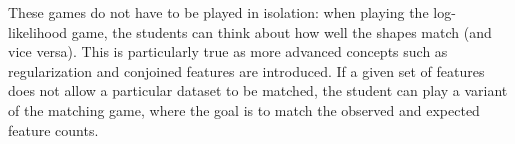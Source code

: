 \documentclass[11pt,letterpaper]{article}
\begin{document}
These games do not have to be played in isolation: when playing the log-likelihood game, the 
students can think about how well the shapes match (and vice versa).
This is particularly true as more advanced concepts such as regularization and 
conjoined features are introduced.
If a given set of features does not allow a particular dataset to be matched, 
the student can play a variant of the matching game, where the goal
is to match the observed and expected feature counts. 

\end{document}
